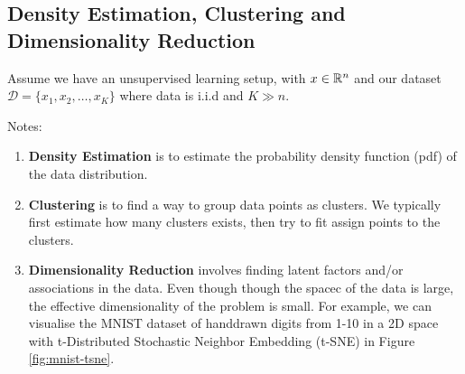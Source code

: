 \subsection{Density Estimation, Clustering and Dimensionality Reduction}

Assume we have an unsupervised learning setup, with $x \in \mathbb{R}^n$ and our dataset $\mathcal{D} = \{ x_1, x_2, \ldots, x_K \}$ where data is i.i.d and  $K \gg n$.

Notes:
\begin{enumerate}
    \item  \textbf{Density Estimation} is to estimate the probability density function (pdf) of the data distribution. 
    \item  \textbf{Clustering} is to find a way to group data points as clusters. We typically first estimate how many clusters exists, then try to fit assign points to the clusters.
    \item \textbf{Dimensionality Reduction} involves finding latent factors and/or associations in the data. Even though though the spacec of the data is large, the effective dimensionality of the problem is small. For example, we can visualise the MNIST dataset of handdrawn digits from 1-10 in a 2D space with t-Distributed Stochastic Neighbor Embedding (t-SNE) in Figure \ref{fig:mnist-tsne}.


\end{enumerate}
